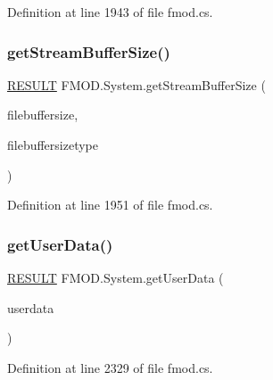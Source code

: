 Definition at line 1943 of file fmod.\+cs.

\mbox{\label{class_f_m_o_d_1_1_system_ad87710f2978de4f283be1fddc902d502}} 
\subsubsection{\texorpdfstring{get\+Stream\+Buffer\+Size()}{getStreamBufferSize()}}
{\footnotesize\ttfamily \hyperlink{namespace_f_m_o_d_a305d1176ef3f8c8815861a60407ac33d}{R\+E\+S\+U\+LT} F\+M\+O\+D.\+System.\+get\+Stream\+Buffer\+Size (\begin{DoxyParamCaption}\item[{out uint}]{filebuffersize,  }\item[{out \hyperlink{namespace_f_m_o_d_aff20975332f93ff2180d2681cb43929f}{T\+I\+M\+E\+U\+N\+IT}}]{filebuffersizetype }\end{DoxyParamCaption})}



Definition at line 1951 of file fmod.\+cs.

\mbox{\label{class_f_m_o_d_1_1_system_a91ca1f6b683c5c6286e3d2f0e3663fa9}} 
\subsubsection{\texorpdfstring{get\+User\+Data()}{getUserData()}}
{\footnotesize\ttfamily \hyperlink{namespace_f_m_o_d_a305d1176ef3f8c8815861a60407ac33d}{R\+E\+S\+U\+LT} F\+M\+O\+D.\+System.\+get\+User\+Data (\begin{DoxyParamCaption}\item[{out Int\+Ptr}]{userdata }\end{DoxyParamCaption})}



Definition at line 2329 of file fmod.\+cs.

\mbox{\label{class_f_m_o_d_1_1_system_a5b90cb0486a438be013594aed2c84dbb}} 
